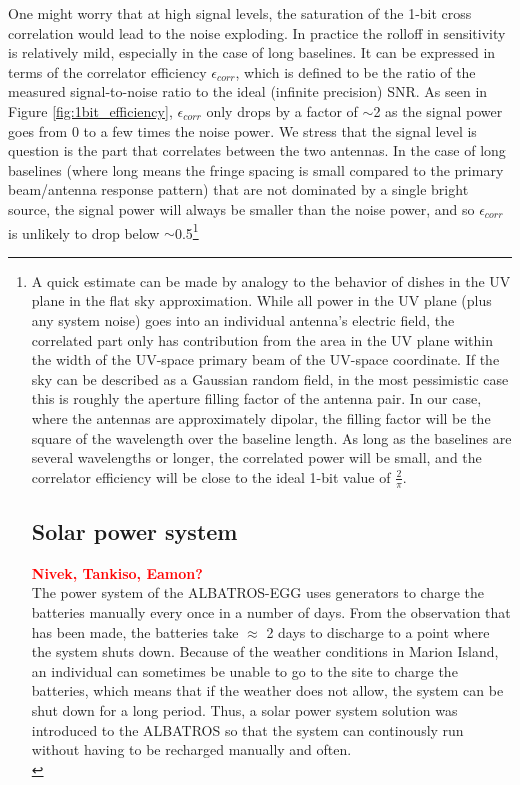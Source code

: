 \documentclass{ws-jai}
\begin{document}
One might worry that at high signal levels, the saturation of the 1-bit cross correlation would lead to the noise exploding.  In practice the rolloff in sensitivity is relatively mild, especially in the case of long baselines.  It can be expressed in terms of the correlator efficiency $\epsilon_{corr}$, which is defined to be the ratio of the measured signal-to-noise ratio to the ideal (infinite precision) SNR.  As seen in Figure \ref{fig:1bit_efficiency}, $\epsilon_{corr}$ only drops by a factor of $\sim$2 as the signal power goes from 0 to a few times the noise power.  We stress that the signal level is question is the part that correlates between the two antennas.  In the case of long baselines (where long means the fringe spacing is small compared to the primary beam/antenna response pattern) that are not dominated by a single bright source, the signal power will always be smaller than the noise power, and so $\epsilon_{corr}$ is unlikely to drop below $\sim$0.5\footnote{A quick estimate can be made by analogy to the behavior of dishes in the UV plane in the flat sky approximation.  While all power in the UV plane (plus any system noise) goes into an individual antenna's electric field, the correlated part only has contribution from the area in the UV plane within the width of the UV-space primary beam of the UV-space coordinate.  If the sky can be described as a Gaussian random field, in the most pessimistic case this is roughly the aperture filling factor of the antenna pair.  In our case, where the antennas are approximately dipolar, the filling factor will be the square of the wavelength over the baseline length.  As long as the baselines are several wavelengths or longer, the correlated power will be small, and the correlator efficiency will be close to the ideal 1-bit value of $\frac{2}{\pi}$.  


\subsection{Solar power system}
\textcolor{red}{\bf Nivek, Tankiso, Eamon?} \\
The power system of the ALBATROS-EGG uses generators to charge the batteries manually every once in a number of days. From the observation that has been made, the batteries take $\approx$ 2 days to discharge to a point where the system shuts down. Because of the weather conditions in Marion Island, an individual can sometimes be unable to go to the site to charge the batteries, which means that if the weather does not allow, the system can be shut down for a long period. Thus, a solar power system solution was introduced to the ALBATROS so that the system can continously run without having to be recharged manually and often.\\

}
\end{document}
